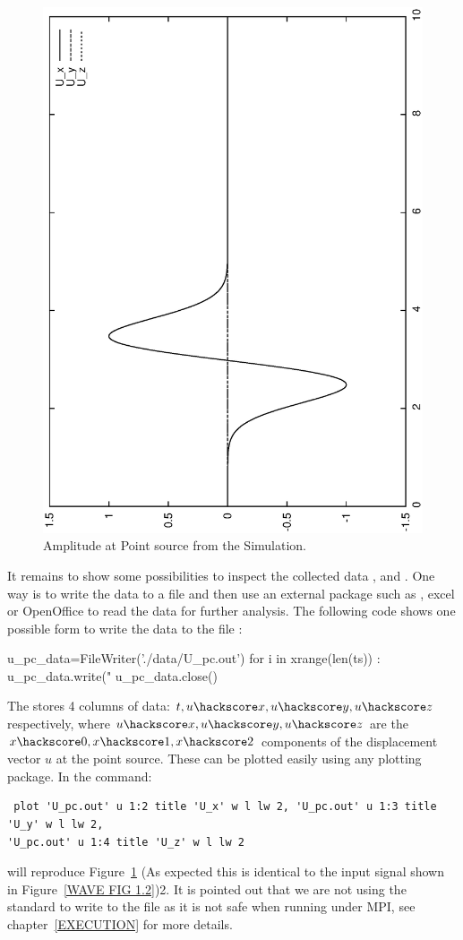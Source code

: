 \begin{figure}[t!]
\centerline{\includegraphics[width=4.in, angle=-90]{figures/WavePC}}
\caption{Amplitude at Point source from the Simulation.}
\label{WAVE FIG 1}
\end{figure}

It remains to show some possibilities to inspect the collected data ,  and .
One way is to write the data to a file and then use an external package such as \gnuplot, excel or OpenOffice to read the data for further analysis. The following code shows one possible form to write the data to the 
file :
\begin{python}
u_pc_data=FileWriter('./data/U_pc.out')
for i in xrange(len(ts)) :
    u_pc_data.write("%
u_pc_data.close()
\end{python}
The  stores 4 columns of data: $t,u\hackscore x,u\hackscore y,u\hackscore z$ 
respectively, where $u\hackscore x,u\hackscore y,u\hackscore z$ are the $x\hackscore 0,x\hackscore 1,x\hackscore 2$ components of the displacement vector $u$ at the point source. These can be
plotted easily using any plotting package. In \gnuplot the command:
\begin{verbatim}
 plot 'U_pc.out' u 1:2 title 'U_x' w l lw 2, 'U_pc.out' u 1:3 title 'U_y' w l lw 2, 
'U_pc.out' u 1:4 title 'U_z' w l lw 2
\end{verbatim}
will reproduce Figure~\ref{WAVE FIG 1} (As expected this is identical to the input signal shown in Figure~\ref{WAVE FIG 1.2})2. It is pointed out that we are not using the
standard \PYTHON {} to write to the file  as it is not safe
when running \escript under MPI, see chapter~\ref{EXECUTION} for more details.


